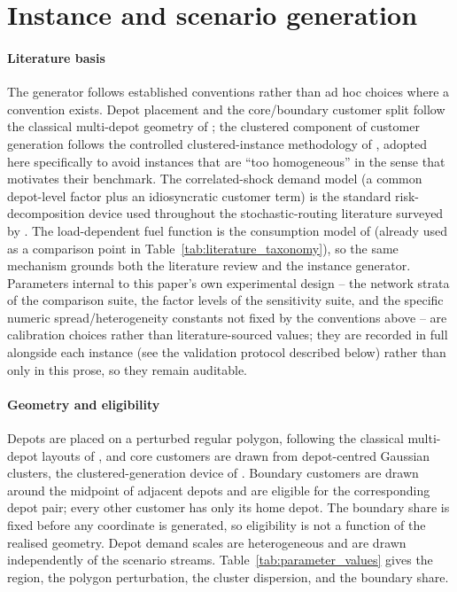 \documentclass[authoryear,final,3p,times]{elsarticle}
\theoremstyle{definition}
\theoremstyle{plain}
\begin{document}
\section{Instance and scenario generation}
\label{app:scenario_generation}

\paragraph{Literature basis}
The generator follows established conventions rather than ad hoc choices where a convention exists.  Depot placement and the core/boundary customer split follow the classical multi-depot geometry of \citet{cordeau1997vrp}; the clustered component of customer generation follows the controlled clustered-instance methodology of \citet{uchoa2017benchmark}, adopted here specifically to avoid instances that are ``too homogeneous'' in the sense that motivates their benchmark.  The correlated-shock demand model (a common depot-level factor plus an idiosyncratic customer term) is the standard risk-decomposition device used throughout the stochastic-routing literature surveyed by \citet{gendreau1996stochastic}.  The load-dependent fuel function is the consumption model of \citet{bektas2011pollution} (already used as a comparison point in Table~\ref{tab:literature_taxonomy}), so the same mechanism grounds both the literature review and the instance generator.  Parameters internal to this paper's own experimental design -- the network strata of the comparison suite, the factor levels of the sensitivity suite, and the specific numeric spread/heterogeneity constants not fixed by the conventions above -- are calibration choices rather than literature-sourced values; they are recorded in full alongside each instance (see the validation protocol described below) rather than only in this prose, so they remain auditable.

\paragraph{Geometry and eligibility}
Depots are placed on a perturbed regular polygon, following the classical multi-depot layouts of \citet{cordeau1997vrp}, and core customers are drawn from depot-centred Gaussian clusters, the clustered-generation device of \citet{uchoa2017benchmark}.  Boundary customers are drawn around the midpoint of adjacent depots and are eligible for the corresponding depot pair; every other customer has only its home depot.  The boundary share is fixed before any coordinate is generated, so eligibility is not a function of the realised geometry.  Depot demand scales are heterogeneous and are drawn independently of the scenario streams.  Table~\ref{tab:parameter_values} gives the region, the polygon perturbation, the cluster dispersion, and the boundary share.
\end{document}
